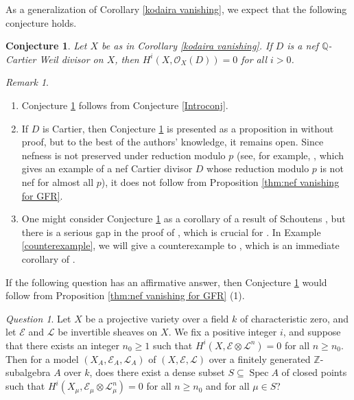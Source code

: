 \documentclass[12pt]{amsart}
\def\ge{\geqslant}
\def\Spec{\operatorname{Spec}}
\newcommand{\Q}{\mathbb{Q}}
\newcommand{\Z}{\mathbb{Z}}
\newcommand{\sO}{\mathcal{O}}
\theoremstyle{plain}
\newtheorem{conj}[thm]{Conjecture}
\theoremstyle{definition}
\theoremstyle{remark}
\newtheorem{rem}[thm]{Remark}
\newtheorem{ques}[thm]{Question}
\newtheorem{defn and notation}[thm]{Definition and Notation}
\theoremstyle{plain}
\begin{document}
As a generalization of Corollary \ref{kodaira vanishing}, we expect that the following conjecture holds. 

\begin{conj}\label{vanishing conj}
Let $X$ be as in Corollary \ref{kodaira vanishing}. 
If $D$ is a nef $\Q$-Cartier Weil divisor on $X$, then $H^i(X, \sO_X(D))=0$ for all $i>0$. 
\end{conj}

\begin{rem}
\begin{enumerate}
\item Conjecture \ref{vanishing conj} follows from Conjecture \ref{Introconj}. 

\item If $D$ is Cartier, then Conjecture \ref{vanishing conj} is presented as a proposition in \cite{Smith00} without proof, but to the best of the authors' knowledge, it remains open. 
Since nefness is not preserved under reduction modulo $p$ (see, for example, \cite[Section 8]{Langer15}, which gives an example of a nef Cartier divisor $D$ whose reduction modulo $p$ is not nef for almost all $p$), it does not follow from Proposition \ref{thm:nef vanishing for GFR}. 

\item  One might consider Conjecture \ref{vanishing conj} as a corollary of a result of Schoutens \cite[Corollary 6.6]{Schoutens05}, but there is a serious gap in the proof of \cite[Theorem 2.15]{Schoutens05}, which is crucial for \cite[Corollary 6.6]{Schoutens05}. 
In Example \ref{counterexample}, we will give a counterexample to \cite[Corollary 2.16]{Schoutens05}, which is an immediate corollary of \cite[Theorem 2.15]{Schoutens05}. 
\end{enumerate}
\end{rem}

If the following question has an affirmative answer, then Conjecture \ref{vanishing conj} would follow from Proposition \ref{thm:nef vanishing for GFR} (1).  
\begin{ques}\label{vanishing ques}
Let $X$ be a projective variety over a field $k$ of characteristic zero, and let $\mathcal{E}$ and $\mathcal{L}$ be invertible sheaves on $X$. 
We fix a positive integer $i$, and suppose that there exists an integer $n_0 \ge 1$ such that $H^i(X, \mathcal{E}\otimes \mathcal{L}^n)=0$ for all $n \ge n_0$. 
Then for a model $(X_A, \mathcal{E}_A, \mathcal{L}_A)$ of $(X, \mathcal{E}, \mathcal{L})$ over a finitely generated $\Z$-subalgebra $A$ over $k$, does there exist a dense subset $S \subseteq \Spec A$ of closed points such that 
$H^i(X_{\mu}, \mathcal{E}_{\mu} \otimes \mathcal{L}^n_{\mu})=0$ for all $n \ge n_0$ and for all $\mu \in S$? 
\end{ques}
\end{document}

